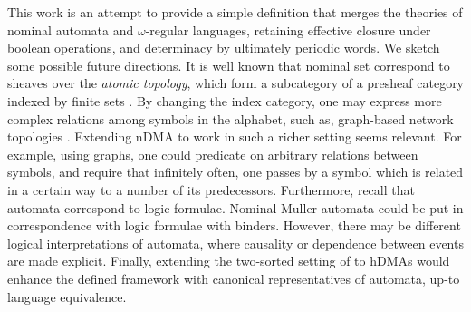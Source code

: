 This work is an attempt to provide a simple definition that merges the theories of nominal automata and $\omega$-regular languages, retaining effective closure under boolean operations, and determinacy by ultimately periodic words. We sketch some possible future directions. It is well known that nominal set correspond to sheaves over the \emph{atomic topology}, which form a subcategory of a presheaf category indexed by finite sets \cite{fabio,staton}. By changing the index category, one may express more complex relations among symbols in the alphabet, such as, graph-based network topologies \cite{matteo}. Extending nDMA to work in such a richer setting seems relevant. For example, using graphs, one could predicate on arbitrary relations between symbols, and require that infinitely often, one passes by a symbol which is related in a certain way to a number of its predecessors. Furthermore, recall that automata correspond to logic formulae. Nominal Muller automata could be put in correspondence with logic formulae with binders. However, there may be different logical interpretations of automata, where causality or dependence between events are made explicit. Finally, extending the two-sorted setting of \cite{CV12} to hDMAs would enhance the defined framework with canonical representatives of automata, up-to language equivalence.
